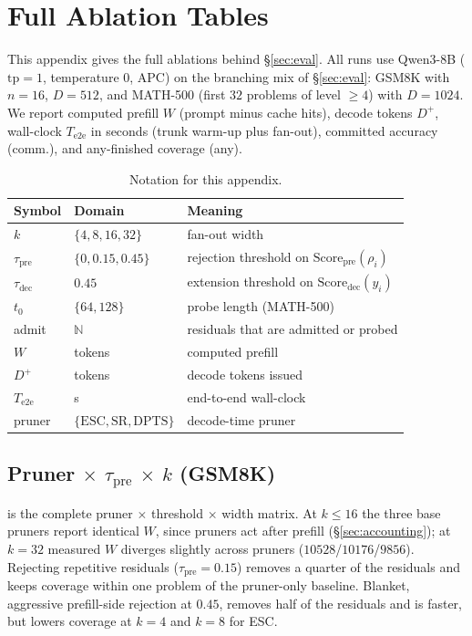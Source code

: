 \section{Full Ablation Tables}
\label{sec:ablation-full}

This appendix gives the full ablations behind \S\ref{sec:eval}.
All runs use Qwen3-8B ($\mathrm{tp}{=}1$, temperature $0$, APC) on the branching mix of \S\ref{sec:eval}:
GSM8K with $n{=}16$, $D{=}512$, and MATH-500 (first $32$ problems of level $\ge4$) with $D{=}1024$.
We report computed prefill $W$ (prompt minus cache hits), decode tokens $D^{+}$, wall-clock $T_{\mathrm{e2e}}$ in seconds (trunk warm-up plus fan-out),
committed accuracy (comm.), and any-finished coverage (any).

\begin{table}[t]
\centering
\caption{Notation for this appendix.}
\label{tab:notation}
\scriptsize
\begin{tabular}{@{}llp{}@{}}
\toprule
Symbol & Domain & Meaning \\
\midrule
$k$ & $\{4,8,16,32\}$ & fan-out width \\
$\tau_{\mathrm{pre}}$ & $\{0,0.15,0.45\}$ & rejection threshold on $\mathrm{Score}_{\mathrm{pre}}(\rho_i)$ \\
$\tau_{\mathrm{dec}}$ & $0.45$ & extension threshold on $\mathrm{Score}_{\mathrm{dec}}(y_i)$ \\
$t_0$ & $\{64,128\}$ & probe length (MATH-500) \\
admit & $\mathbb{N}$ & residuals that are admitted or probed \\
$W$ & tokens & computed prefill \\
$D^{+}$ & tokens & decode tokens issued \\
$T_{\mathrm{e2e}}$ & s & end-to-end wall-clock \\
pruner & $\{\mathrm{ESC},\mathrm{SR},\mathrm{DPTS}\}$ & decode-time pruner \\
\bottomrule
\end{tabular}
\end{table}

\subsection{Pruner $\times$ $\tau_{\mathrm{pre}}$ $\times$ $k$ (GSM8K)}
\label{sec:ablate-thresh}

 is the complete pruner $\times$ threshold $\times$ width matrix.
At $k\le16$ the three base pruners report identical $W$, since pruners act after prefill (\S\ref{sec:accounting}); at $k{=}32$ measured $W$ diverges slightly across pruners ($10528$/$10176$/$9856$).
Rejecting repetitive residuals ($\tau_{\mathrm{pre}}{=}0.15$) removes a quarter of the residuals
and keeps coverage within one problem of the pruner-only baseline.
Blanket, aggressive prefill-side rejection at $0.45$, removes half of the residuals and is faster, but
lowers coverage at $k{=}4$ and $k{=}8$ for ESC.

